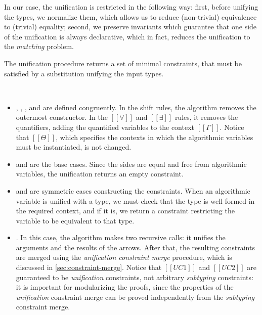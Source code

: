 \documentclass[acmsmall,natbib=false,review,anonymous]{acmart}
\begin{document}
In our case, the unification is restricted in the following way:
first, before unifying the types, we normalize them, which 
allows us to reduce (non-trivial) equivalence to (trivial) equality;
second, we preserve invariants which guarantee that
one side of the unification is always declarative, which in fact, 
reduces the unification to the \emph{matching} problem.

The unification procedure
returns a set of minimal constraints,
that must be satisfied by a substitution
unifying the input types.

\begin{algorithm}[Unification]
  \hfill
  \begin{multicols}{2}
  \ottdefnUNUnifLabeled{}
  \columnbreak\\
  \ottdefnUPUnifLabeled{}
  \end{multicols}
\end{algorithm}


\begin{itemize}
  \item {}, , 
    , and 
    are defined congruently. In the shift rules, the algorithm
    removes the outermost constructor. In the
    $[[∀]]$ and $[[∃]]$ rules, it removes the quantifiers,
    adding the quantified variables to the context $[[Γ]]$.
    Notice that $[[Θ]]$, which specifies
    the contexts in which the algorithmic variables must be instantiated,
    is not changed.
  \item {} and  
    are the base cases. 
    Since the sides are equal and free from algorithmic variables,
    the unification returns an empty constraint. 
  \item {} and 
    are symmetric cases constructing the constraints. 
    When an algorithmic variable is unified with a type, 
    we must check that the type is well-formed in the required context,
    and if it is, we return a constraint restricting the variable
    to be equivalent to that type.
  \item {}.
    In this case, the algorithm makes two recursive calls:
    it unifies the arguments and the results of the arrows.
    After that, the resulting constraints are merged using the
    \emph{unification constraint merge} procedure, 
    which is discussed in \cref{sec:constraint-merge}.
    Notice that $[[UC1]]$ and $[[UC2]]$ are guaranteed to be
    \emph{unification} constraints, not arbitrary \emph{subtyping} 
    constraints: it is important for modularizing the proofs, 
    since the properties of the \emph{unification} constraint merge
    can be proved independently from the \emph{subtyping} constraint merge.
\end{itemize}
\end{document}
